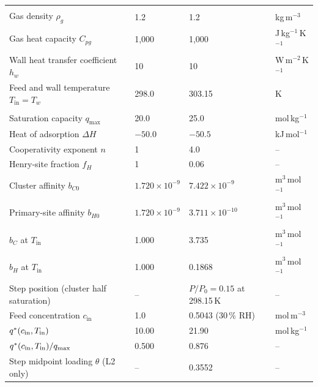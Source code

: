\begin{table}[htbp]
\begin{tabularx}{\textwidth}{@{}>{\raggedright\arraybackslash}Xlll@{}}
\midrule
\multicolumn{4}{@{}l}{\textit{Gas and thermal boundary}}\\
Gas density $\rho_g$ & 1.2 & 1.2 & kg\,m$^{-3}$ \\
Gas heat capacity $C_{pg}$ & 1,000 & 1,000 & J\,kg$^{-1}$\,K$^{-1}$ \\
Wall heat transfer coefficient $h_w$ & 10 & 10 & W\,m$^{-2}$\,K$^{-1}$ \\
Feed and wall temperature $T_{\mathrm{in}} = T_w$ & 298.0 & 303.15 & K \\
\midrule
\multicolumn{4}{@{}l}{\textit{Equilibrium}}\\
Saturation capacity $q_{\max}$ & 20.0 & 25.0 & mol\,kg$^{-1}$ \\
Heat of adsorption $\Delta H$ & $-50.0$ & $-50.5$ & kJ\,mol$^{-1}$ \\
Cooperativity exponent $n$ & 1 & 4.0 & -- \\
Henry-site fraction $f_H$ & 1 & 0.06 & -- \\
Cluster affinity $b_{C0}$ & $1.720\times10^{-9}$ & $7.422\times10^{-9}$ & m$^3$\,mol$^{-1}$ \\
Primary-site affinity $b_{H0}$ & $1.720\times10^{-9}$ & $3.711\times10^{-10}$ & m$^3$\,mol$^{-1}$ \\
$b_C$ at $T_{\mathrm{in}}$ & 1.000 & 3.735 & m$^3$\,mol$^{-1}$ \\
$b_H$ at $T_{\mathrm{in}}$ & 1.000 & 0.1868 & m$^3$\,mol$^{-1}$ \\
Step position (cluster half saturation) & -- & $P/P_0 = 0.15$ at 298.15\,K & -- \\
Feed concentration $c_{\mathrm{in}}$ & 1.0 & 0.5043 (30\,\% RH) & mol\,m$^{-3}$ \\
$q^{*}(c_{\mathrm{in}}, T_{\mathrm{in}})$ & 10.00 & 21.90 & mol\,kg$^{-1}$ \\
$q^{*}(c_{\mathrm{in}}, T_{\mathrm{in}})/q_{\max}$ & 0.500 & 0.876 & -- \\
Step midpoint loading $\theta$ (L2 only) & -- & 0.3552 & -- \\

\end{tabularx}
\end{table}
